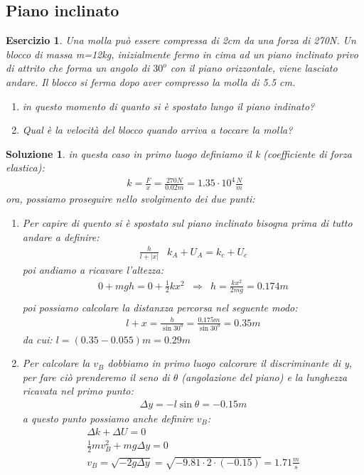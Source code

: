\documentclass{article}
\newcommand{\abs}[1]{\lvert#1\rvert}
\newtheorem{es}{Esercizio}[section]
\newtheorem{sol}{Soluzione}[section]
\begin{document}
\subsection{Piano inclinato}
\label{sec:pianoinc}

\begin{es}
  Una molla può essere compressa di 2cm da una forza di 270N. Un blocco di massa m=12kg, inizialmente fermo in cima ad un piano inclinato privo di attrito che forma un angolo di $30^o$ con il piano orizzontale, viene lasciato andare. Il blocco si ferma dopo aver compresso la molla di 5.5 cm.
  \begin{enumerate}
  \item in questo momento di quanto si è spostato lungo il piano indinato?
  \item Qual è la velocità del blocco quando arriva a toccare la molla?
  \end{enumerate}
\end{es}
\begin{sol}
  in questa caso in primo luogo definiamo il k (coefficiente di forza elastica):
  \begin{eqnarray*}
    k=\frac{F}{x}=\frac{270N}{0.02m}=1.35\cdot 10^4\frac{N}{m}
  \end{eqnarray*}
  ora, possiamo proseguire nello svolgimento dei due punti:
  \begin{enumerate}
  \item Per capire di quento si è spostato sul piano inclinato bisogna prima di tutto andare a definire:
    \begin{eqnarray*}
      \frac{h}{l+\abs{x}} & k_A+U_A=k_c+U_c
    \end{eqnarray*}
    poi andiamo a ricavare l'altezza:
    \begin{eqnarray*}
      0+mgh=0+\frac{1}{2}kx^2 &\Rightarrow & h=\frac{kx^2}{2mg}=0.174m\\
    \end{eqnarray*}
    poi possiamo calcolare la distanxza percorsa nel seguente modo:
    \begin{eqnarray*}
      l+x=\frac{h}{\sin 30^o}=\frac{0.175m}{\sin 30^o}=0.35m
    \end{eqnarray*}
    da cui: $l=(0.35-0.055)m=0.29m$
  \item Per calcolare la $v_B$ dobbiamo in primo luogo calcorare il discriminante di y, per fare ciò prenderemo il seno di $\theta$ (angolazione del piano) e la lunghezza ricavata nel primo punto:
    \begin{eqnarray*}
      \Delta y=-l\sin\theta=-0.15m
    \end{eqnarray*}
    a questo punto possiamo anche definire $v_B$:
    \begin{eqnarray*}
      \Delta k + \Delta U = 0\\
      \frac{1}{2}mv_B^2+mg\Delta y=0\\
      v_B=\sqrt{-2g\Delta y}=\sqrt{-9.81\cdot 2\cdot (-0.15)}=1.71\frac{m}{s}
    \end{eqnarray*}
  \end{enumerate}
\end{sol}
\end{document}
